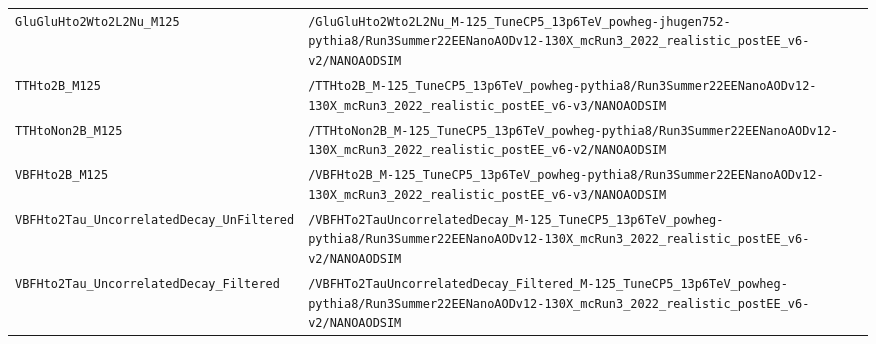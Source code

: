 \begin{longtable}{@{}>{\RaggedRight\arraybackslash}p{} >{\RaggedRight\arraybackslash}p{}@{}}
\addlinespace[2pt]
\texttt{GluGluHto2Wto2L2Nu\_\allowbreak{}M125} & \texttt{/\allowbreak{}GluGluHto2Wto2L2Nu\_\allowbreak{}M-\allowbreak{}125\_\allowbreak{}TuneCP5\_\allowbreak{}13p6TeV\_\allowbreak{}powheg-\allowbreak{}jhugen752-\allowbreak{}pythia8/\allowbreak{}Run3Summer22EENanoAODv12-\allowbreak{}130X\_\allowbreak{}mcRun3\_\allowbreak{}2022\_\allowbreak{}realistic\_\allowbreak{}postEE\_\allowbreak{}v6-\allowbreak{}v2/\allowbreak{}NANOAODSIM} \\
\addlinespace[2pt]
\texttt{TTHto2B\_\allowbreak{}M125} & \texttt{/\allowbreak{}TTHto2B\_\allowbreak{}M-\allowbreak{}125\_\allowbreak{}TuneCP5\_\allowbreak{}13p6TeV\_\allowbreak{}powheg-\allowbreak{}pythia8/\allowbreak{}Run3Summer22EENanoAODv12-\allowbreak{}130X\_\allowbreak{}mcRun3\_\allowbreak{}2022\_\allowbreak{}realistic\_\allowbreak{}postEE\_\allowbreak{}v6-\allowbreak{}v3/\allowbreak{}NANOAODSIM} \\
\addlinespace[2pt]
\texttt{TTHtoNon2B\_\allowbreak{}M125} & \texttt{/\allowbreak{}TTHtoNon2B\_\allowbreak{}M-\allowbreak{}125\_\allowbreak{}TuneCP5\_\allowbreak{}13p6TeV\_\allowbreak{}powheg-\allowbreak{}pythia8/\allowbreak{}Run3Summer22EENanoAODv12-\allowbreak{}130X\_\allowbreak{}mcRun3\_\allowbreak{}2022\_\allowbreak{}realistic\_\allowbreak{}postEE\_\allowbreak{}v6-\allowbreak{}v2/\allowbreak{}NANOAODSIM} \\
\addlinespace[2pt]
\texttt{VBFHto2B\_\allowbreak{}M125} & \texttt{/\allowbreak{}VBFHto2B\_\allowbreak{}M-\allowbreak{}125\_\allowbreak{}TuneCP5\_\allowbreak{}13p6TeV\_\allowbreak{}powheg-\allowbreak{}pythia8/\allowbreak{}Run3Summer22EENanoAODv12-\allowbreak{}130X\_\allowbreak{}mcRun3\_\allowbreak{}2022\_\allowbreak{}realistic\_\allowbreak{}postEE\_\allowbreak{}v6-\allowbreak{}v3/\allowbreak{}NANOAODSIM} \\
\addlinespace[2pt]
\texttt{VBFHto2Tau\_\allowbreak{}UncorrelatedDecay\_\allowbreak{}UnFiltered} & \texttt{/\allowbreak{}VBFHTo2TauUncorrelatedDecay\_\allowbreak{}M-\allowbreak{}125\_\allowbreak{}TuneCP5\_\allowbreak{}13p6TeV\_\allowbreak{}powheg-\allowbreak{}pythia8/\allowbreak{}Run3Summer22EENanoAODv12-\allowbreak{}130X\_\allowbreak{}mcRun3\_\allowbreak{}2022\_\allowbreak{}realistic\_\allowbreak{}postEE\_\allowbreak{}v6-\allowbreak{}v2/\allowbreak{}NANOAODSIM} \\
\addlinespace[2pt]
\texttt{VBFHto2Tau\_\allowbreak{}UncorrelatedDecay\_\allowbreak{}Filtered} & \texttt{/\allowbreak{}VBFHTo2TauUncorrelatedDecay\_\allowbreak{}Filtered\_\allowbreak{}M-\allowbreak{}125\_\allowbreak{}TuneCP5\_\allowbreak{}13p6TeV\_\allowbreak{}powheg-\allowbreak{}pythia8/\allowbreak{}Run3Summer22EENanoAODv12-\allowbreak{}130X\_\allowbreak{}mcRun3\_\allowbreak{}2022\_\allowbreak{}realistic\_\allowbreak{}postEE\_\allowbreak{}v6-\allowbreak{}v2/\allowbreak{}NANOAODSIM} \\

\end{longtable}
